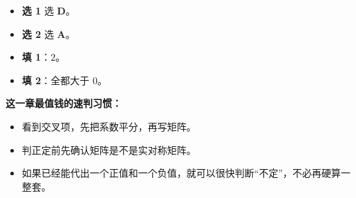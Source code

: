 \documentclass[11pt,oneside,UTF8]{ctexbook}
\begin{document}
\begin{summarybox}[快练答案与小技巧]
\begin{itemize}
  \item \textbf{选 1} 选 \textbf{D}。
  \item \textbf{选 2} 选 \textbf{A}。
  \item \textbf{填 1}：\(2\)。
  \item \textbf{填 2}：全都大于 \(0\)。
\end{itemize}

\textbf{这一章最值钱的速判习惯：}
\begin{itemize}
  \item 看到交叉项，先把系数平分，再写矩阵。
  \item 判正定前先确认矩阵是不是实对称矩阵。
  \item 如果已经能代出一个正值和一个负值，就可以很快判断“不定”，不必再硬算一整套。
\end{itemize}
\end{summarybox}
\end{document}
